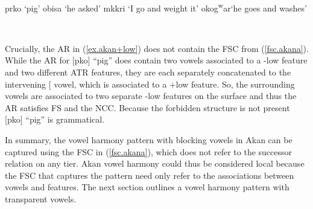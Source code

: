 \documentclass[,doc,floatsintext]{apa6}
\theoremstyle{definition}
\theoremstyle{definition}
\theoremstyle{definition}
\theoremstyle{remark}
\begin{document}
\begin{exe}
  \label{akan_+low}
  \begin{xlist}
    \ex prko  `pig'
    \ex obisa `he asked'
    \ex mkkri  `I go and weight it'
    \ex okog\textsuperscript{w}ar\textraiseglotstop `he goes and washes'
  \end{xlist}
\end{exe}

\begin{exe}
\label{ex.akan+low} \\
\end{exe}

\noindent Crucially, the AR in (\ref{ex.akan+low}) does not contain the
FSC from (\ref{fsc.akana}). While the AR for {[}pko{]}
\enquote{pig} does contain two vowels associated to a -low feature and
two different ATR features, they are each separately concatenated to the
intervening {[}\textipa{3}{]} vowel, which is associated to a +low
feature. So, the surrounding vowels are associated to two separate -low
features on the surface and thus the AR satisfies FS and the NCC.
Because the forbidden structure is not present {[}pko{]}
\enquote{pig} is grammatical.

In summary, the vowel harmony pattern with blocking vowels in Akan can
be captured using the FSC in (\ref{fsc.akana}), which does not refer to
the successor relation on any tier. Akan vowel harmony could thus be
considered local because the FSC that captures the pattern need only
refer to the associations between vowels and features. The next section
outlines a vowel harmony pattern with transparent vowels.
\end{document}
